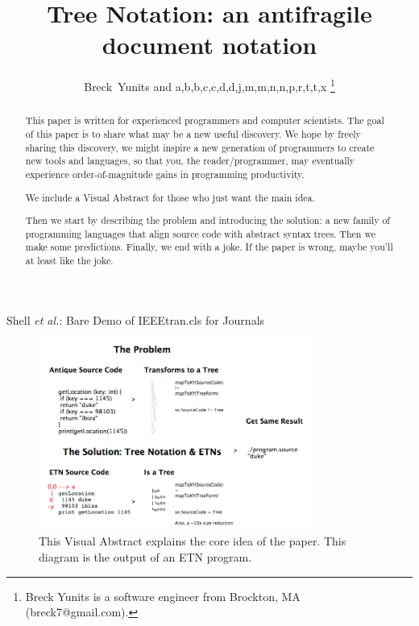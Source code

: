 \documentclass[journal]{IEEEtran}
\begin{document}
\title{Tree Notation: an antifragile document notation}

\author{Breck~Yunits and a,b,b,c,c,d,d,j,m,m,n,n,p,r,t,t,x%
\thanks{Breck Yunits is a software engineer from Brockton, MA (breck7@gmail.com).}%
}

%
{Shell \MakeLowercase{\textit{et al.}}: Bare Demo of IEEEtran.cls for Journals}

\maketitle


\begin{abstract}
This paper is written for experienced programmers and computer scientists. The goal of this paper is to share what may be a new useful discovery. We hope by freely sharing this discovery, we might inspire a new generation of programmers to create new tools and languages, so that you, the reader/programmer, may eventually experience order-of-magnitude gains in programming productivity.

We include a Visual Abstract for those who just want the main idea.

Then we start by describing the problem and introducing the solution: a new family of programming languages that align source code with abstract syntax trees. Then we make some predictions. Finally, we end with a joke. If the paper is wrong, maybe you'll at least like the joke.

\end{abstract}

\IEEEpeerreviewmaketitle

\begin{figure}[ht!]
\centering
\includegraphics[width=90mm]{treenotation.png}
\caption{This Visual Abstract explains the core idea of the paper. This diagram is the output of an ETN program.}
\end{figure}
\end{document}
